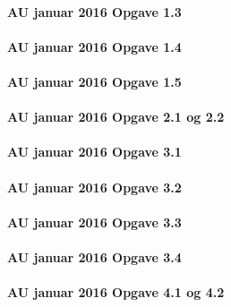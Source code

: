 \documentclass[]{book}
\let\oldparagraph\paragraph
\renewcommand{\paragraph}[1]{\oldparagraph{#1}\mbox{}}
\begin{document}
\hypertarget{au-januar-2016-opgave-1.3}{%
\paragraph{AU januar 2016 Opgave 1.3}\label{au-januar-2016-opgave-1.3}}

\hypertarget{au-januar-2016-opgave-1.4}{%
\paragraph{AU januar 2016 Opgave 1.4}\label{au-januar-2016-opgave-1.4}}

\hypertarget{au-januar-2016-opgave-1.5}{%
\paragraph{AU januar 2016 Opgave 1.5}\label{au-januar-2016-opgave-1.5}}

\hypertarget{au-januar-2016-opgave-2.1-og-2.2}{%
\paragraph{AU januar 2016 Opgave 2.1 og
2.2}\label{au-januar-2016-opgave-2.1-og-2.2}}

\hypertarget{au-januar-2016-opgave-3.1}{%
\paragraph{AU januar 2016 Opgave 3.1}\label{au-januar-2016-opgave-3.1}}

\hypertarget{au-januar-2016-opgave-3.2}{%
\paragraph{AU januar 2016 Opgave 3.2}\label{au-januar-2016-opgave-3.2}}

\hypertarget{au-januar-2016-opgave-3.3}{%
\paragraph{AU januar 2016 Opgave 3.3}\label{au-januar-2016-opgave-3.3}}

\hypertarget{au-januar-2016-opgave-3.4}{%
\paragraph{AU januar 2016 Opgave 3.4}\label{au-januar-2016-opgave-3.4}}

\hypertarget{au-januar-2016-opgave-4.1-og-4.2}{%
\paragraph{AU januar 2016 Opgave 4.1 og
4.2}\label{au-januar-2016-opgave-4.1-og-4.2}}
\end{document}
